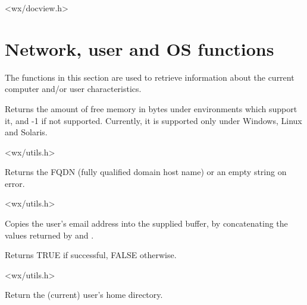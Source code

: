 <wx/docview.h>

\section{Network, user and OS functions}\label{networkfunctions}

The functions in this section are used to retrieve information about the
current computer and/or user characteristics.

\label{wxgetfreememory}


Returns the amount of free memory in bytes under environments which
support it, and -1 if not supported. Currently, it is supported only
under Windows, Linux and Solaris.


<wx/utils.h>

\label{wxgetfullhostname}


Returns the FQDN (fully qualified domain host name) or an empty string on
error.




<wx/utils.h>

\label{wxgetemailaddress}


Copies the user's email address into the supplied buffer, by
concatenating the values returned by \rtfsp
and .

Returns TRUE if successful, FALSE otherwise.


<wx/utils.h>

\label{wxgethomedir}


Return the (current) user's home directory.



